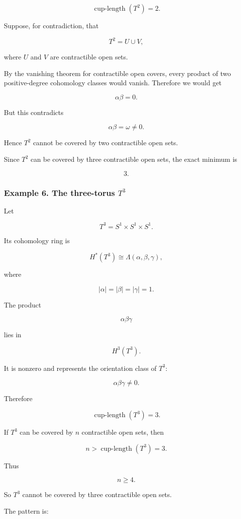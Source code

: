 \documentclass[12pt,a4paper]{article}
\theoremstyle{notespace}
\begin{document}
\[
\operatorname{cup\text{-}length}(T^2)=2.
\]

Suppose, for contradiction, that

\[
T^2=U\cup V,
\]

where \(U\) and \(V\) are contractible open sets.

By the vanishing theorem for contractible open covers, every product of two positive-degree cohomology classes would vanish. Therefore we would get

\[
\alpha\beta=0.
\]

But this contradicts

\[
\alpha\beta=\omega\neq 0.
\]

Hence \(T^2\) cannot be covered by two contractible open sets.

Since \(T^2\) can be covered by three contractible open sets, the exact minimum is

\[
\boxed{3.}
\]

\subsubsection{Example 6. The three-torus \(T^3\)}

Let

\[
T^3=S^1\times S^1\times S^1.
\]

Its cohomology ring is

\[
H^*(T^3)
\cong
\Lambda(\alpha,\beta,\gamma),
\]

where

\[
|\alpha|=|\beta|=|\gamma|=1.
\]

The product

\[
\alpha\beta\gamma
\]

lies in

\[
H^3(T^3).
\]

It is nonzero and represents the orientation class of \(T^3\):

\[
\alpha\beta\gamma\neq 0.
\]

Therefore

\[
\operatorname{cup\text{-}length}(T^3)=3.
\]

If \(T^3\) can be covered by \(n\) contractible open sets, then

\[
n>\operatorname{cup\text{-}length}(T^3)=3.
\]

Thus

\[
\boxed{
	n\geq 4.
}
\]

So \(T^3\) cannot be covered by three contractible open sets.

The pattern is:
\end{document}
